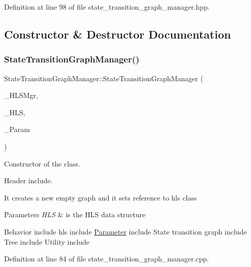 Definition at line 98 of file state\+\_\+transition\+\_\+graph\+\_\+manager.\+hpp.



\subsection{Constructor \& Destructor Documentation}
\mbox{\label{classStateTransitionGraphManager_a138e3a539f39750d6715514a28644970}} 
\subsubsection{\texorpdfstring{State\+Transition\+Graph\+Manager()}{StateTransitionGraphManager()}}
{\footnotesize\ttfamily State\+Transition\+Graph\+Manager\+::\+State\+Transition\+Graph\+Manager (\begin{DoxyParamCaption}\item[{const \hyperlink{hls__manager_8hpp_a1b481383e3beabc89bd7562ae672dd8c}{H\+L\+S\+\_\+manager\+Const\+Ref}}]{\+\_\+\+H\+L\+S\+Mgr,  }\item[{\hyperlink{hls_8hpp_a75d0c73923d0ddfa28c4843a802c73a7}{hls\+Ref}}]{\+\_\+\+H\+LS,  }\item[{const \hyperlink{Parameter_8hpp_a37841774a6fcb479b597fdf8955eb4ea}{Parameter\+Const\+Ref}}]{\+\_\+\+Param }\end{DoxyParamCaption})}



Constructor of the class. 

Header include.

It creates a new empty graph and it sets reference to hls class 
\begin{DoxyParams}{Parameters}
{\em H\+LS} & is the H\+LS data structure\\
\hline
\end{DoxyParams}
Behavior include hls include \hyperlink{classParameter}{Parameter} include State transition graph include Tree include Utility include 

Definition at line 84 of file state\+\_\+transition\+\_\+graph\+\_\+manager.\+cpp.



